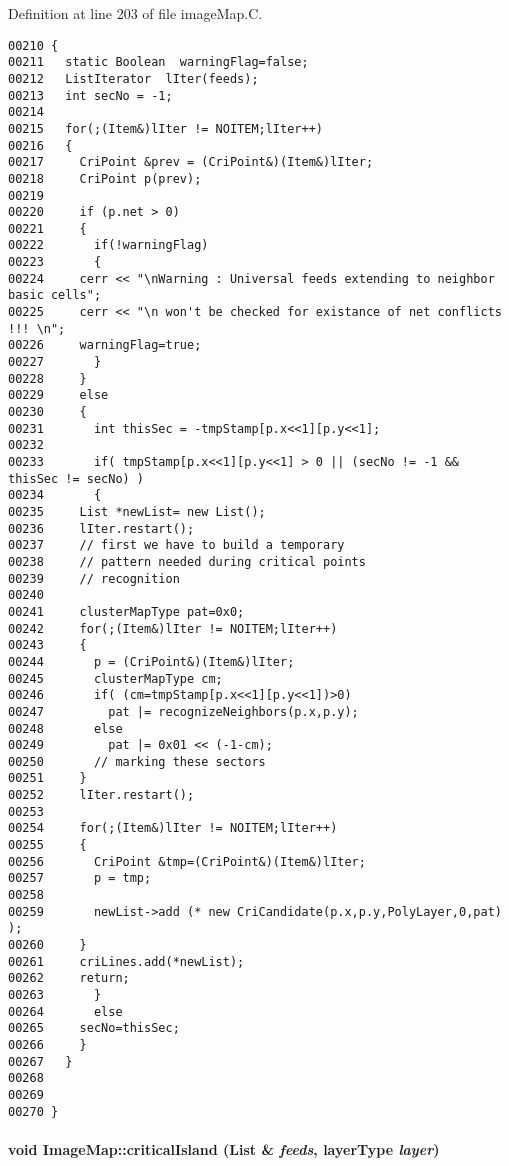 Definition at line 203 of file image\-Map.C.\small\begin{verbatim}00210 {
00211   static Boolean  warningFlag=false;
00212   ListIterator  lIter(feeds);
00213   int secNo = -1;
00214   
00215   for(;(Item&)lIter != NOITEM;lIter++)
00216   {
00217     CriPoint &prev = (CriPoint&)(Item&)lIter;
00218     CriPoint p(prev);
00219     
00220     if (p.net > 0)
00221     {
00222       if(!warningFlag)
00223       {
00224     cerr << "\nWarning : Universal feeds extending to neighbor basic cells";
00225     cerr << "\n won't be checked for existance of net conflicts !!! \n";
00226     warningFlag=true;
00227       }
00228     }
00229     else
00230     {
00231       int thisSec = -tmpStamp[p.x<<1][p.y<<1];
00232       
00233       if( tmpStamp[p.x<<1][p.y<<1] > 0 || (secNo != -1 && thisSec != secNo) )  
00234       {
00235     List *newList= new List();
00236     lIter.restart();
00237     // first we have to build a temporary
00238     // pattern needed during critical points
00239     // recognition
00240     
00241     clusterMapType pat=0x0;
00242     for(;(Item&)lIter != NOITEM;lIter++)
00243     {
00244       p = (CriPoint&)(Item&)lIter;
00245       clusterMapType cm;
00246       if( (cm=tmpStamp[p.x<<1][p.y<<1])>0)
00247         pat |= recognizeNeighbors(p.x,p.y);
00248       else
00249         pat |= 0x01 << (-1-cm); 
00250       // marking these sectors
00251     }
00252     lIter.restart();
00253     
00254     for(;(Item&)lIter != NOITEM;lIter++)
00255     {
00256       CriPoint &tmp=(CriPoint&)(Item&)lIter;
00257       p = tmp;
00258       
00259       newList->add (* new CriCandidate(p.x,p.y,PolyLayer,0,pat) );
00260     }
00261     criLines.add(*newList);
00262     return;
00263       }
00264       else
00265     secNo=thisSec;
00266     }
00267   }
00268   
00269 
00270 }
\end{verbatim}\normalsize 
\label{ImageMap_a5}
\paragraph{\setlength{\rightskip}{0pt plus 5cm}void Image\-Map::critical\-Island ({\bf List} \& {\em feeds}, {\bf layer\-Type} {\em layer})}\hfill



